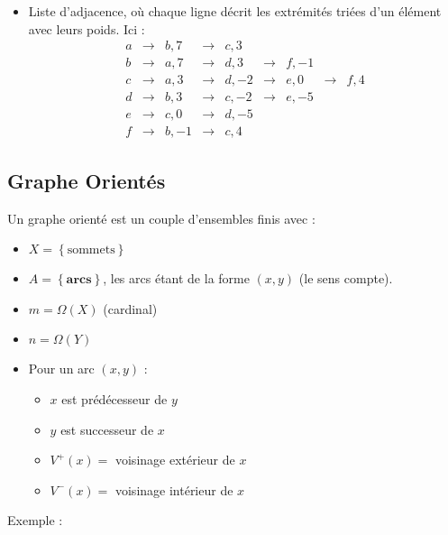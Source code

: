 \documentclass[a4paper, 8pt]{article}
\begin{document}
\begin{multicols*}{3}
\begin{itemize}
	\item Liste d'adjacence, où chaque ligne décrit les extrémités triées d'un élément avec leurs poids. Ici :
	\[\begin{smallmatrix}
	 a & \longrightarrow & b,7 & \longrightarrow & c,3 &  & &  &  \\ 
	 b & \longrightarrow & a,7 & \longrightarrow & d,3 & \longrightarrow & f,-1 &  &  \\ 
	 c & \longrightarrow & a,3 & \longrightarrow & d,-2 & \longrightarrow & e,0 & \longrightarrow & f,4 \\ 
	 d & \longrightarrow & b,3 & \longrightarrow & c,-2 & \longrightarrow & e,-5 &  &  \\ 
	 e & \longrightarrow & c,0 & \longrightarrow & d,-5 &  &  &  &  \\ 
	 f & \longrightarrow & b,-1 & \longrightarrow & c,4 &  &  &  & 
	 \end{smallmatrix}  \]
\end{itemize}

\subsection*{Graphe Orientés}
Un graphe orienté \GXA est un couple d'ensembles finis avec :
\begin{itemize}
\item $X = \left\{\text{sommets}\right\}$
\item $A = \left\{\mathbf{arcs}\right\}$, les arcs étant de la forme $(x,y)$ (le sens compte).
\item $m = \Omega(X)$ (cardinal)
\item $n = \Omega(Y)$
\item Pour un arc $(x,y)$ :
	\begin{itemize}
	\item $x$ est prédécesseur de $y$
	\item $y$ est successeur de $x$
	\item $V^+(x) =$ voisinage extérieur de $x$
	\item $V^-(x) =$ voisinage intérieur de $x$
	\end{itemize}
\end{itemize}
\medskip
Exemple :
\begin{center}
\end{center}
\end{multicols*}
\end{document}
